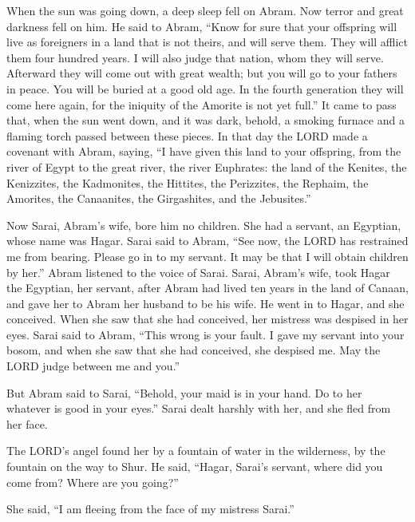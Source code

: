 \myverse{}When the sun was going down, a deep sleep fell on Abram. Now terror and great darkness fell on him. \myverse{}He said to Abram, “Know for sure that your offspring will live as foreigners in a land that is not theirs, and will serve them. They will afflict them four hundred years. \myverse{}I will also judge that nation, whom they will serve. Afterward they will come out with great wealth; \myverse{}but you will go to your fathers in peace. You will be buried at a good old age. \myverse{}In the fourth generation they will come here again, for the iniquity of the Amorite is not yet full.” \myverse{}It came to pass that, when the sun went down, and it was dark, behold, a smoking furnace and a flaming torch passed between these pieces. \myverse{}In that day the LORD made a covenant with Abram, saying, “I have given this land to your offspring, from the river of Egypt to the great river, the river Euphrates: \myverse{}the land of the Kenites, the Kenizzites, the Kadmonites, \myverse{}the Hittites, the Perizzites, the Rephaim, \myverse{}the Amorites, the Canaanites, the Girgashites, and the Jebusites.”

\mychapter{}
\myverse*{}Now Sarai, Abram’s wife, bore him no children. She had a servant, an Egyptian, whose name was Hagar. \myverse{}Sarai said to Abram, “See now, the LORD has restrained me from bearing. Please go in to my servant. It may be that I will obtain children by her.” Abram listened to the voice of Sarai. \myverse{}Sarai, Abram’s wife, took Hagar the Egyptian, her servant, after Abram had lived ten years in the land of Canaan, and gave her to Abram her husband to be his wife. \myverse{}He went in to Hagar, and she conceived. When she saw that she had conceived, her mistress was despised in her eyes. \myverse{}Sarai said to Abram, “This wrong is your fault. I gave my servant into your bosom, and when she saw that she had conceived, she despised me. May the LORD judge between me and you.”

\myverse{}But Abram said to Sarai, “Behold, your maid is in your hand. Do to her whatever is good in your eyes.” Sarai dealt harshly with her, and she fled from her face.

\myverse{}The LORD’s angel found her by a fountain of water in the wilderness, by the fountain on the way to Shur. \myverse{}He said, “Hagar, Sarai’s servant, where did you come from? Where are you going?”

She said, “I am fleeing from the face of my mistress Sarai.”

